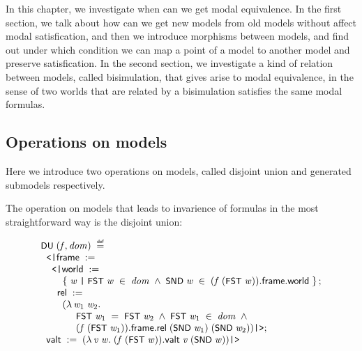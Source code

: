 \documentclass[letterpaper]{article}
\renewcommand{\HOLConst}[1]{{\textsf{\upshape\small #1}}}
\newenvironment{holmath}{\begin{displaymath}\begin{array}{l}}{\end{array}\end{displaymath}\ignorespacesafterend}
\begin{document}
In this chapter, we investigate when can we get modal equivalence. In the first section, we talk about how can we get new models from old models without affect modal satisfication, and then we introduce morphisms between models, and find out under which condition we can map a point of a model to another model and preserve satisfication. In the second section, we investigate a kind of relation between models, called bisimulation, that gives arise to modal equivalence, in the sense of two worlds that are related by a bisimulation satisfies the same modal formulas.


\subsection{Operations on models}

Here we introduce two operations on models, called disjoint union and generated submodels respectively. 

The operation on models that leads to invarience of formulas in the most straightforward way is the disjoint union:

\begin{holmath}
   \HOLConst{DU}\;(\HOLFreeVar{f}\HOLSymConst{,}\HOLFreeVar{dom})\;\HOLSymConst{\HOLTokenDefEquality{}}\\
\;\;\HOLTokenLeftrec{}\HOLFieldName{frame}\;:=\\
\;\;\;\;\HOLTokenLeftrec{}\HOLFieldName{world}\;:=\\
\;\;\;\;\;\;\;\;\HOLTokenLeftbrace{}\HOLBoundVar{w}\;\HOLTokenBar{}\;\HOLConst{FST}\;\HOLBoundVar{w}\;\HOLSymConst{\HOLTokenIn{}}\;\HOLFreeVar{dom}\;\HOLSymConst{\HOLTokenConj{}}\;\HOLConst{SND}\;\HOLBoundVar{w}\;\HOLSymConst{\HOLTokenIn{}}\;(\HOLFreeVar{f}\;(\HOLConst{FST}\;\HOLBoundVar{w})).\HOLFieldName{frame}.\HOLFieldName{world}\HOLTokenRightbrace{};\\
\;\;\;\;\;\;\HOLFieldName{rel}\;:=\\
\;\;\;\;\;\;\;\;(\HOLTokenLambda{}\HOLBoundVar{w\sb{\mathrm{1}}}\;\HOLBoundVar{w\sb{\mathrm{2}}}.\\
\;\;\;\;\;\;\;\;\;\;\;\;\;\HOLConst{FST}\;\HOLBoundVar{w\sb{\mathrm{1}}}\;\HOLSymConst{=}\;\HOLConst{FST}\;\HOLBoundVar{w\sb{\mathrm{2}}}\;\HOLSymConst{\HOLTokenConj{}}\;\HOLConst{FST}\;\HOLBoundVar{w\sb{\mathrm{1}}}\;\HOLSymConst{\HOLTokenIn{}}\;\HOLFreeVar{dom}\;\HOLSymConst{\HOLTokenConj{}}\\
\;\;\;\;\;\;\;\;\;\;\;\;\;(\HOLFreeVar{f}\;(\HOLConst{FST}\;\HOLBoundVar{w\sb{\mathrm{1}}})).\HOLFieldName{frame}.\HOLFieldName{rel}\;(\HOLConst{SND}\;\HOLBoundVar{w\sb{\mathrm{1}}})\;(\HOLConst{SND}\;\HOLBoundVar{w\sb{\mathrm{2}}}))\HOLTokenRightrec{};\\
\;\;\HOLFieldName{valt}\;:=\;(\HOLTokenLambda{}\HOLBoundVar{v}\;\HOLBoundVar{w}.\;(\HOLFreeVar{f}\;(\HOLConst{FST}\;\HOLBoundVar{w})).\HOLFieldName{valt}\;\HOLBoundVar{v}\;(\HOLConst{SND}\;\HOLBoundVar{w}))\HOLTokenRightrec{}
\end{holmath} 
\end{document}
